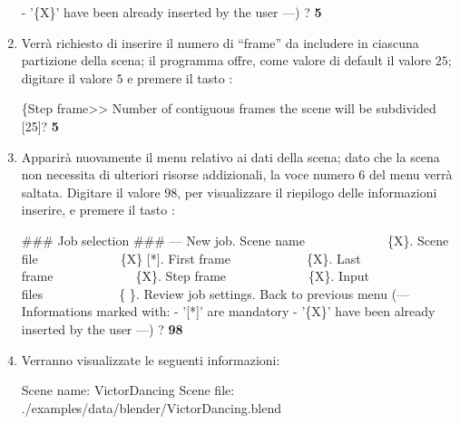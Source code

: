 \begin{enumerate}
\begin{mgCodeBox}
 - '\{X\}' have been already inserted by the user\newline
---)\newline
? \textbf{5}
\end{mgCodeBox}
\item Verr\`a richiesto di inserire il numero di ``frame'' da includere in ciascuna partizione della scena; il programma offre, come valore di default il valore $25$; digitare il valore $5$ e premere il tasto :
\begin{mgCodeBox}
\small
\{Step frame>> Number of contiguous frames the scene will be subdivided [25]? \textbf{5}
\end{mgCodeBox}
\item Apparir\`a nuovamente il menu relativo ai dati della scena; dato che la scena non necessita di ulteriori risorse addizionali, la voce numero $6$ del menu verr\`a saltata. Digitare il valore $98$, per visualizzare il riepilogo delle informazioni inserire, e premere il tasto :
\begin{mgCodeBox}
\small
\#\#\# Job selection \#\#\#\newline
--- New job. Scene name\ \ \ \ \ \ \ \ \ \ \ \ \ \{X\}. Scene file\ \ \ \ \ \ \ \ \ \ \ \ \ \{X\} [*]. First frame\ \ \ \ \ \ \ \ \ \ \ \ \{X\}. Last frame\ \ \ \ \ \ \ \ \ \ \ \ \ \{X\}. Step frame\ \ \ \ \ \ \ \ \ \ \ \ \ \{X\}. Input files\ \ \ \ \ \ \ \ \ \ \ \ \{ \}. Review job settings. Back to previous menu\newline
(---\newline
 Informations marked with:\newline
 - '[*]' are mandatory\newline
 - '\{X\}' have been already inserted by the user\newline
---)\newline
? \textbf{98}
\end{mgCodeBox}
\item Verranno visualizzate le seguenti informazioni:
\begin{mgCodeBox}
\small
Scene name: VictorDancing\newline
Scene file: ./examples/data/blender/VictorDancing.blend\newline

\end{mgCodeBox}
\end{enumerate}
